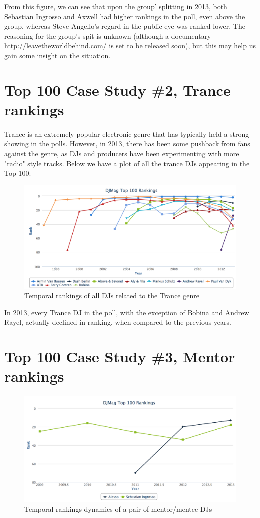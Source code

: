\documentclass[12pt]{dalcsthesis}
\begin{document}
From this figure, we can see that upon the group' splitting in 2013, both Sebastian Ingrosso and Axwell had higher rankings in the poll, even above the group, whereas Steve Angello's regard in the public eye was ranked lower. The reasoning for the group's spit is unknown (although a documentary \url{http://leavetheworldbehind.com/} is set to be released soon), but this may help us gain some insight on the situation.

\section{Top 100 Case Study \#2, Trance rankings}

Trance is an extremely popular electronic genre that has typically held a strong showing in the polls. However, in 2013, there has been some pushback from fans against the genre, as DJs and producers have been experimenting with more "radio" style tracks. Below we have a plot of all the trance DJs appearing in the Top 100:

\begin{figure}[h]
\includegraphics[scale=.4]{trance_graph}
\centering
\caption{Temporal rankings of all DJs related to the Trance genre}
\end{figure}

In 2013, every Trance DJ in the poll, with the exception of Bobina and Andrew Rayel, actually declined in ranking, when compared to the previous years.

\section{Top 100 Case Study \#3, Mentor rankings}

\begin{figure}[h]
\includegraphics[scale=.65]{alesso_seb_graph}
\centering
\caption{Temporal rankings dynamics of a pair of mentor/mentee DJs}
\end{figure}
\end{document}
